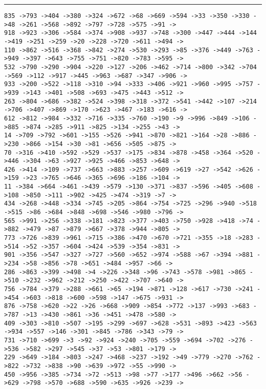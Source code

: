 \documentclass[letter, 12pt]{article}
\newenvironment{question}[1]{%
    \vspace{.2in}%
        \noindent{\bf #1}%
    \vspace{0.3em} \hrule \vspace{.1in}%
}{}
\begin{document}
\begin{question}{\large Appendix}
\begin{lstlisting}[style=CStyle]
835 ->793 ->404 ->380 ->324 ->672 ->68 ->669 ->594 ->33 ->350 ->330 ->48 ->261 ->568 ->892 ->797 ->728 ->575 ->91 ->
918 ->923 ->306 ->584 ->374 ->908 ->937 ->748 ->300 ->447 ->444 ->144 ->419 ->251 ->259 ->20 ->228 ->720 ->611 ->494 ->
110 ->862 ->516 ->368 ->842 ->274 ->530 ->293 ->85 ->376 ->449 ->763 ->949 ->397 ->643 ->755 ->751 ->820 ->783 ->595 ->
532 ->790 ->290 ->904 ->220 ->127 ->206 ->462 ->714 ->800 ->342 ->704 ->569 ->112 ->917 ->445 ->963 ->687 ->347 ->906 ->
933 ->200 ->522 ->118 ->310 ->94 ->333 ->406 ->921 ->960 ->995 ->757 ->939 ->143 ->401 ->508 ->693 ->475 ->443 ->512 ->
263 ->804 ->686 ->382 ->524 ->398 ->318 ->372 ->541 ->442 ->107 ->214 ->706 ->407 ->869 ->170 ->623 ->467 ->183 ->616 ->
612 ->812 ->984 ->332 ->716 ->335 ->760 ->190 ->9 ->996 ->849 ->106 ->885 ->874 ->285 ->911 ->825 ->134 ->255 ->43 ->
14 ->709 ->792 ->601 ->155 ->526 ->941 ->870 ->821 ->164 ->28 ->886 ->230 ->866 ->154 ->30 ->81 ->656 ->505 ->875 ->
70 ->316 ->410 ->592 ->529 ->537 ->175 ->834 ->878 ->458 ->364 ->520 ->446 ->304 ->63 ->927 ->925 ->466 ->853 ->648 ->
426 ->414 ->109 ->737 ->663 ->883 ->257 ->609 ->619 ->27 ->542 ->626 ->159 ->23 ->765 ->646 ->365 ->696 ->186 ->104 ->
11 ->384 ->664 ->461 ->439 ->579 ->130 ->371 ->837 ->596 ->405 ->608 ->108 ->850 ->111 ->902 ->425 ->474 ->319 ->7 ->
434 ->268 ->448 ->334 ->745 ->205 ->864 ->754 ->725 ->296 ->940 ->518 ->515 ->86 ->684 ->848 ->698 ->546 ->980 ->796 ->
565 ->991 ->256 ->338 ->181 ->823 ->377 ->403 ->750 ->928 ->418 ->74 ->882 ->479 ->87 ->879 ->667 ->378 ->944 ->805 ->
773 ->726 ->839 ->961 ->715 ->386 ->470 ->670 ->721 ->355 ->18 ->283 ->514 ->52 ->357 ->604 ->424 ->539 ->354 ->831 ->
901 ->356 ->547 ->327 ->727 ->560 ->652 ->974 ->588 ->67 ->394 ->881 ->234 ->58 ->856 ->78 ->651 ->484 ->957 ->66 ->
286 ->863 ->399 ->498 ->4 ->226 ->348 ->96 ->743 ->578 ->981 ->865 ->510 ->232 ->962 ->212 ->250 ->422 ->707 ->640 ->
756 ->784 ->379 ->288 ->661 ->65 ->194 ->871 ->128 ->617 ->730 ->241 ->454 ->603 ->818 ->600 ->598 ->147 ->675 ->931 ->
876 ->758 ->620 ->22 ->26 ->668 ->909 ->854 ->772 ->137 ->993 ->683 ->787 ->13 ->430 ->861 ->36 ->451 ->478 ->580 ->
409 ->303 ->810 ->507 ->195 ->299 ->697 ->628 ->531 ->893 ->423 ->563 ->934 ->557 ->146 ->301 ->845 ->786 ->343 ->79 ->
731 ->710 ->699 ->3 ->92 ->924 ->240 ->705 ->559 ->694 ->702 ->276 ->536 ->582 ->297 ->545 ->37 ->53 ->801 ->179 ->
229 ->649 ->184 ->803 ->247 ->468 ->237 ->192 ->49 ->779 ->270 ->762 ->822 ->732 ->838 ->90 ->639 ->972 ->55 ->990 ->
450 ->956 ->385 ->734 ->72 ->513 ->98 ->77 ->177 ->496 ->662 ->56 ->629 ->798 ->570 ->688 ->590 ->635 ->926 ->239 ->

\end{lstlisting}
\end{question}
\end{document}
